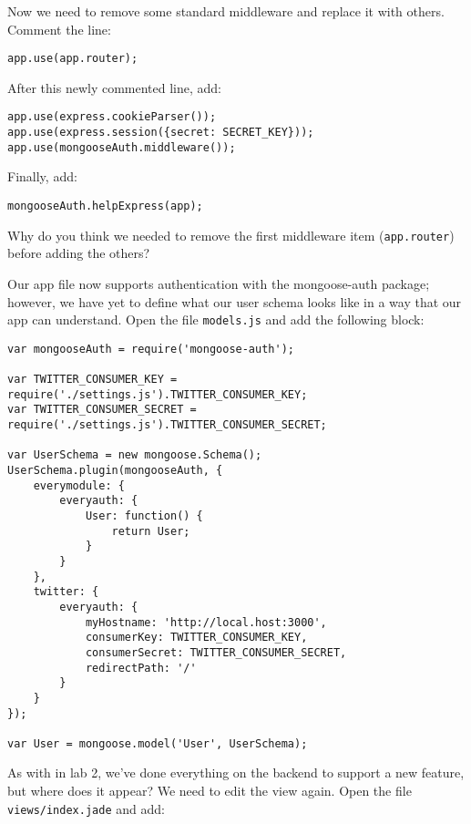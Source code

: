 \documentclass{article}
\begin{document}
Now we need to remove some standard middleware and replace it with others. Comment the line:

\begin{verbatim}
app.use(app.router);
\end{verbatim}

After this newly commented line, add:

\begin{verbatim}
app.use(express.cookieParser());
app.use(express.session({secret: SECRET_KEY}));
app.use(mongooseAuth.middleware());
\end{verbatim}

Finally, add:

\begin{verbatim}
mongooseAuth.helpExpress(app);
\end{verbatim}

 Why do you think we needed to remove the first middleware item (\verb!app.router!) before adding the others?


Our app file now supports authentication with the mongoose-auth package; however, we have yet to define what our user schema looks like in a way that our app can understand. Open the file \verb!models.js! and add the following block:

\begin{verbatim}
var mongooseAuth = require('mongoose-auth');

var TWITTER_CONSUMER_KEY = require('./settings.js').TWITTER_CONSUMER_KEY;
var TWITTER_CONSUMER_SECRET = require('./settings.js').TWITTER_CONSUMER_SECRET;

var UserSchema = new mongoose.Schema();
UserSchema.plugin(mongooseAuth, {
    everymodule: {
        everyauth: {
            User: function() {
                return User;
            }   
        }   
    },  
    twitter: {
        everyauth: {
            myHostname: 'http://local.host:3000',
            consumerKey: TWITTER_CONSUMER_KEY,
            consumerSecret: TWITTER_CONSUMER_SECRET,
            redirectPath: '/' 
        }   
    }
});

var User = mongoose.model('User', UserSchema);
\end{verbatim}


As with in lab 2, we've done everything on the backend to support a new feature, but where does it appear? We need to edit the view again. Open the file \verb!views/index.jade! and add:
\end{document}
